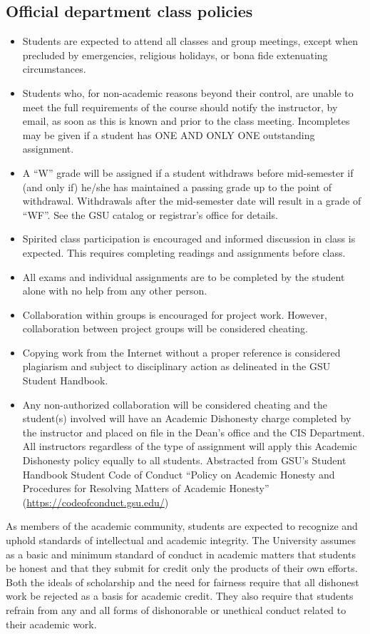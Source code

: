 \documentclass{article}
\begin{document}
\subsection{Official department class policies}
\begin{itemize}
	\item Students are expected to attend all classes and group meetings, except when precluded by emergencies, religious holidays, or bona ﬁde extenuating circumstances.
	\item Students who, for non-academic reasons beyond their control, are unable to meet the full requirements of the course should notify the instructor, by email, as soon as this is known and prior to the class meeting. Incompletes may be given if a student has ONE AND ONLY ONE outstanding assignment.
	\item A “W” grade will be assigned if a student withdraws before mid-semester if (and only if) he/she has maintained a passing grade up to the point of withdrawal. Withdrawals after the mid-semester date will result in a grade of “WF”. See the GSU catalog or registrar’s oﬃce for details.
	\item Spirited class participation is encouraged and informed discussion in class is expected. This requires completing readings and assignments before class.
	\item All exams and individual assignments are to be completed by the student alone with no help from any other person.
	\item Collaboration within groups is encouraged for project work. However, collaboration between project groups will be considered cheating.
	\item Copying work from the Internet without a proper reference is considered plagiarism and subject to disciplinary action as delineated in the GSU Student Handbook.
	\item Any non-authorized collaboration will be considered cheating and the student(s) involved will have an Academic Dishonesty charge completed by the instructor and placed on ﬁle in the Dean’s oﬃce and the CIS Department. All instructors regardless of the type of assignment will apply this Academic Dishonesty policy equally to all students. Abstracted from GSU’s Student Handbook Student Code of Conduct “Policy on Academic Honesty and Procedures for Resolving Matters of Academic Honesty” (\url{https://codeofconduct.gsu.edu/})
	
\end{itemize}
\begin{flushleft}
	As members of the academic community, students are expected to recognize and uphold standards of intellectual and academic integrity. The University assumes as a basic and minimum standard of conduct in academic matters that students be honest and that they submit for credit only the products of their own eﬀorts. Both the ideals of scholarship and the need for fairness require that all dishonest work be rejected as a basis for academic credit. They also require that students refrain from any and all forms of dishonorable or unethical conduct related to their academic work.
\end{flushleft}
\end{document}
